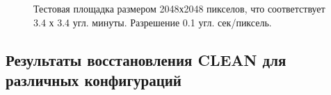 \documentclass[10pt,a4paper]{article}
\begin{document}
\begin{figure}
\caption{Тестовая площадка размером 2048х2048 пикселов, что соответствует 3.4 х 3.4 угл. минуты. Разрешение 0.1 угл. сек/пиксель.}
\label{fig:HUDF2014}
\end{figure}

\subsection{Результаты восстановления CLEAN для различных конфигураций}
\end{document}
